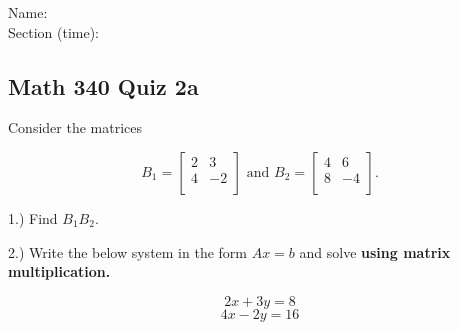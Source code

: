 \documentclass{article}
\begin{document}
Name:\\
\medskip
Section (time):

\subsection*{Math 340 Quiz 2a}

Consider the matrices 

$$B_1=\left[\begin{array}{cc}
2 & 3 \\
4 & -2 \\
\end{array}\right]\text{ and }B_2=\left[\begin{array}{cc}
4 & 6 \\
8 & -4 \\
\end{array}\right].$$ 

1.) Find $B_1B_2$. 



2.) Write the below system in the form $Ax=b$ and solve \textbf{using matrix multiplication.}

$$2x + 3y=8$$
$$4x-2y = 16$$
\end{document}
